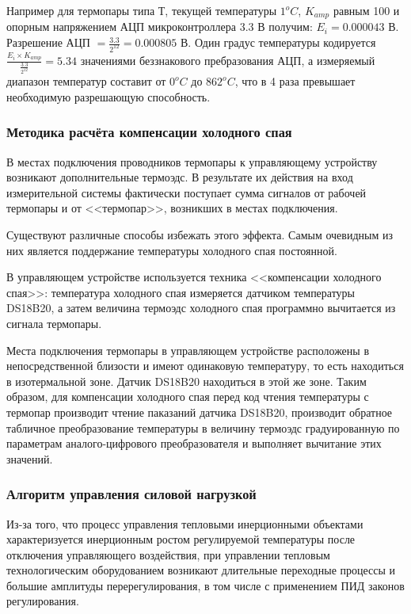 Например для термопары типа Т, текущей температуры $1^oC$, $K_{amp}$ равным 100 и опорным напряжением
АЦП микроконтроллера 3.3 В получим:
$E_i = 0.000043$ В. Разрешение АЦП $= \frac{3.3}{2^{12}} = 0.000805$ В. Один градус температуры
кодируется $\frac{E_i \times{} K_{amp}}{\frac{3.3}{2^{12}}} = 5.34 $ значениями
беззнакового пребразования АЦП, а измеряемый диапазон температур составит от $0^oC$ до $862^oC$,
что в 4 раза превышает необходимую разрешающую способность.

\subsubsection{Методика расчёта компенсации холодного спая}
В местах подключения проводников термопары к управляющему устройству возникают дополнительные термоэдс.
В результате их действия на вход измерительной системы фактически поступает сумма сигналов от рабочей
термопары и от <<термопар>>, возникших в местах подключения.

Существуют различные способы избежать этого эффекта. Самым очевидным из них является поддержание
температуры холодного спая постоянной.

В управляющем устройстве используется техника <<компенсации холодного спая>>: температура холодного спая
измеряется датчиком температуры DS18B20, а затем величина термоэдс холодного спая программно
вычитается из сигнала термопары.

Места подключения термопары в управляющем устройстве расположены в непосредственной близости и имеют одинаковую
температуру, то есть находиться в изотермальной зоне. Датчик DS18B20 находиться в этой же зоне. Таким образом,
для компенсации холодного спая перед код чтения температуры с термопар производит чтение паказаний датчика DS18B20,
производит обратное табличное преобразование температуры в величину термоэдс градуированную по параметрам
аналого-цифрового преобразователя и выполняет вычитание этих значений.

\subsubsection{Алгоритм управления силовой нагрузкой}
Из-за того, что процесс управления тепловыми инерционными объектами характеризуется инерционным ростом
регулируемой температуры после отключения управляющего воздействия, при управлении тепловым
технологическим оборудованием возникают длительные переходные процессы и
большие амплитуды перерегулирования, в том числе с применением ПИД законов регулирования\cite{pwmbook}.

